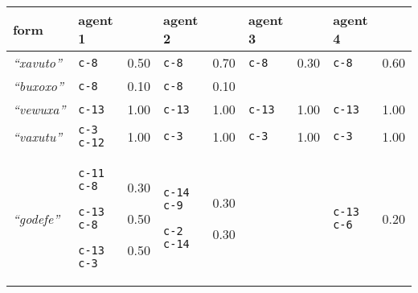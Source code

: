 
{\renewcommand{\arraystretch}{1.5}
\begin{tabular}{@{}p{1.2cm}|p{1.6cm}@{}p{0.8cm}@{}|p{1.6cm}@{}p{0.8cm}@{}|p{1.6cm}@{}p{0.8cm}@{}|p{1.6cm}@{}p{0.8cm}@{}}
form & agent 1 &  & agent 2 &  & agent 3 &  & agent 4 & \\
\hline
\textit{``xavuto''}&\texttt{c-8}
&0.50&\texttt{c-8}
&0.70&\texttt{c-8}
&0.30&\texttt{c-8}
&0.60\\
\hline
\textit{``buxoxo''}&\texttt{c-8}
&0.10&\texttt{c-8}
&0.10&&&&\\
\hline
\textit{``vewuxa''}&\texttt{c-13}
&1.00&\texttt{c-13}
&1.00&\texttt{c-13}
&1.00&\texttt{c-13}
&1.00\\
\hline
\textit{``vaxutu''}&\texttt{c-3 c-12}
&1.00&\texttt{c-3}
&1.00&\texttt{c-3}
&1.00&\texttt{c-3}
&1.00\\
\hline
\textit{``godefe''}&\texttt{c-11 c-8}


\texttt{c-13 c-8}


\texttt{c-13 c-3}
&0.30

0.50

0.50&\texttt{c-14 c-9}


\texttt{c-2 c-14}
&0.30

0.30&&&\texttt{c-13 c-6}
&0.20\\
\end{tabular}}
